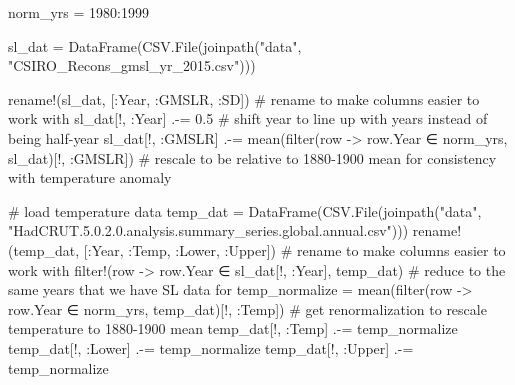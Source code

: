 \documentclass[
  letterpaper,
  DIV=11,
  numbers=noendperiod]{scrartcl}
\newenvironment{Shaded}{\begin{snugshade}}{\end{snugshade}}
\newcommand{\CommentTok}[1]{\textcolor[rgb]{0.37,0.37,0.37}{#1}}
\newcommand{\FloatTok}[1]{\textcolor[rgb]{0.68,0.00,0.00}{#1}}
\newcommand{\FunctionTok}[1]{\textcolor[rgb]{0.28,0.35,0.67}{#1}}
\newcommand{\NormalTok}[1]{\textcolor[rgb]{0.00,0.23,0.31}{#1}}
\newcommand{\OperatorTok}[1]{\textcolor[rgb]{0.37,0.37,0.37}{#1}}
\newcommand{\StringTok}[1]{\textcolor[rgb]{0.13,0.47,0.30}{#1}}
\begin{document}
\begin{Shaded}
\begin{Highlighting}[]

\NormalTok{norm\_yrs }\OperatorTok{=} \FloatTok{1980}\OperatorTok{:}\FloatTok{1999}

\NormalTok{sl\_dat }\OperatorTok{=} \FunctionTok{DataFrame}\NormalTok{(CSV.}\FunctionTok{File}\NormalTok{(}\FunctionTok{joinpath}\NormalTok{(}\StringTok{"data"}\NormalTok{,  }\StringTok{"CSIRO\_Recons\_gmsl\_yr\_2015.csv"}\NormalTok{)))}

\FunctionTok{rename!}\NormalTok{(sl\_dat, [}\OperatorTok{:}\NormalTok{Year, }\OperatorTok{:}\NormalTok{GMSLR, }\OperatorTok{:}\NormalTok{SD]) }\CommentTok{\# rename to make columns easier to work with}
\NormalTok{sl\_dat[!, }\OperatorTok{:}\NormalTok{Year] }\OperatorTok{.{-}=} \FloatTok{0.5} \CommentTok{\# shift year to line up with years instead of being half{-}year }
\NormalTok{sl\_dat[!, }\OperatorTok{:}\NormalTok{GMSLR] }\OperatorTok{.{-}=} \FunctionTok{mean}\NormalTok{(}\FunctionTok{filter}\NormalTok{(row }\OperatorTok{{-}\textgreater{}}\NormalTok{ row.Year }\OperatorTok{∈}\NormalTok{ norm\_yrs, sl\_dat)[!, }\OperatorTok{:}\NormalTok{GMSLR]) }\CommentTok{\# rescale to be relative to 1880{-}1900 mean for consistency with temperature anomaly}

\CommentTok{\# load temperature data}
\NormalTok{temp\_dat }\OperatorTok{=} \FunctionTok{DataFrame}\NormalTok{(CSV.}\FunctionTok{File}\NormalTok{(}\FunctionTok{joinpath}\NormalTok{(}\StringTok{"data"}\NormalTok{, }\StringTok{"HadCRUT.5.0.2.0.analysis.summary\_series.global.annual.csv"}\NormalTok{)))}
\FunctionTok{rename!}\NormalTok{(temp\_dat, [}\OperatorTok{:}\NormalTok{Year, }\OperatorTok{:}\NormalTok{Temp, }\OperatorTok{:}\NormalTok{Lower, }\OperatorTok{:}\NormalTok{Upper]) }\CommentTok{\# rename to make columns easier to work with}
\FunctionTok{filter!}\NormalTok{(row }\OperatorTok{{-}\textgreater{}}\NormalTok{ row.Year }\OperatorTok{∈}\NormalTok{ sl\_dat[!, }\OperatorTok{:}\NormalTok{Year], temp\_dat) }\CommentTok{\# reduce to the same years that we have SL data for}
\NormalTok{temp\_normalize }\OperatorTok{=} \FunctionTok{mean}\NormalTok{(}\FunctionTok{filter}\NormalTok{(row }\OperatorTok{{-}\textgreater{}}\NormalTok{ row.Year }\OperatorTok{∈}\NormalTok{ norm\_yrs, temp\_dat)[!, }\OperatorTok{:}\NormalTok{Temp]) }\CommentTok{\# get renormalization to rescale temperature to 1880{-}1900 mean}
\NormalTok{temp\_dat[!, }\OperatorTok{:}\NormalTok{Temp] }\OperatorTok{.{-}=}\NormalTok{ temp\_normalize}
\NormalTok{temp\_dat[!, }\OperatorTok{:}\NormalTok{Lower] }\OperatorTok{.{-}=}\NormalTok{ temp\_normalize}
\NormalTok{temp\_dat[!, }\OperatorTok{:}\NormalTok{Upper] }\OperatorTok{.{-}=}\NormalTok{  temp\_normalize}


\end{Highlighting}
\end{Shaded}
\end{document}
